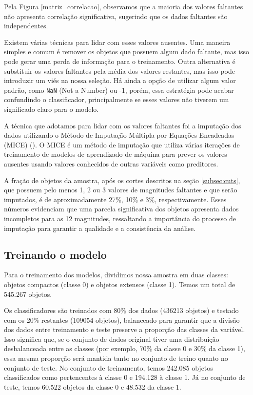 Pela Figura \ref{matriz_correlacao}, observamos que a maioria dos valores faltantes não apresenta correlação significativa, sugerindo que os dados faltantes são independentes.

Existem várias técnicas para lidar com esses valores ausentes. Uma maneira simples e comum é remover os objetos que possuem algum dado faltante, mas isso pode gerar uma perda de informação para o treinamento. Outra alternativa é substituir os valores faltantes pela média dos valores restantes, mas isso pode introduzir um viés na nossa seleção. Há ainda a opção de utilizar algum valor padrão, como \texttt{NaN} (Not a Number) ou -1, porém, essa estratégia pode acabar confundindo o classificador, principalmente se esses valores não tiverem um significado claro para o modelo.

A técnica que adotamos para lidar com os valores faltantes foi a imputação dos dados utilizando o Método de Imputação Múltipla por Equações Encadeadas (MICE) (\citealp{MICE}). O MICE é um método de imputação que utiliza várias iterações de treinamento de modelos de aprendizado de máquina para prever os valores ausentes usando valores conhecidos de outras variáveis como preditores.

A fração de objetos da amostra, após os cortes descritos na seção \ref{subsec:cuts}, que possuem pelo menos 1, 2 ou 3 valores de magnitudes faltantes e que serão imputados, é de aproximadamente 27\%, 10\% e 3\%, respectivamente. Esses números evidenciam que uma parcela significativa dos objetos apresenta dados incompletos para as 12 magnitudes, ressaltando a importância do processo de imputação para garantir a qualidade e a consistência da análise.

\subsection{Treinando o modelo}\label{subsec:treinando_modelo}

Para o treinamento dos modelos, dividimos nossa amostra em duas classes: objetos compactos (classe 0) e objetos extensos (classe 1). Temos um total de 545.267 objetos.

Os classificadores são treinados com 80\% dos dados (436213 objetos) e testado com os 20\% restantes (109054 objetos), balanceado para garantir que a divisão dos dados entre treinamento e teste preserve a proporção das classes da variável. Isso significa que, se o conjunto de dados original tiver uma distribuição desbalanceada entre as classes (por exemplo, 70\% da classe 0 e 30\% da classe 1), essa mesma proporção será mantida tanto no conjunto de treino quanto no conjunto de teste. No conjunto de treinamento, temos 242.085 objetos classificados como pertencentes à classe 0 e 194.128 à classe 1. Já no conjunto de teste, temos 60.522 objetos da classe 0 e 48.532 da classe 1.


